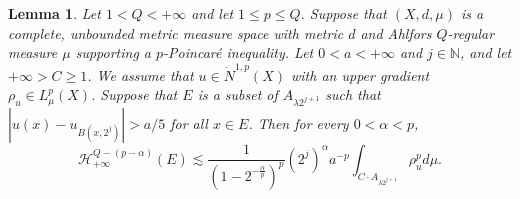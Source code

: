 \documentclass[10pt]{amsart}
\newtheorem{lemma}[theorem]{Lemma}
\numberwithin{equation}{section}
\begin{document}
\begin{lemma}\label{lem3.2}
Let  $1<Q<+\infty$ and let $1\le p\le Q$. 
Suppose that $(X,d,\mu)$ is a complete, unbounded metric measure space with metric $d$ and Ahlfors $Q$-regular measure $\mu$ supporting a $p$-Poincar\'e inequality.
Let  $0<a<+\infty$ and $j\in \mathbb N$, and let $+\infty>C\ge 1$. We assume that $u\in\dot N^{1,p}(X)$ with an upper gradient $\rho_u\in L^p_\mu(X)$. Suppose that
	 $E$ is a subset of $A_{\lambda 2^{j+1}}$ such that 
	$|u(x)-u_{B(x,2^j)}|> {a}/{5}
	$ for all $x\in E$. Then for every $0<\alpha<p$,
	 \begin{equation}\label{eq3.6}
	 \mathcal{H}^{Q-(p-\alpha)}_{{+\infty}}(E)\lesssim  \frac{1}{(1-2^{-\frac{\alpha}{p}})^p} (2^{j})^\alpha a^{-p}\int_{C\cdot A_{\lambda 2^{j+1}}}\rho_u^{p}d\mu.
	 \end{equation}
\end{lemma}
\end{document}
